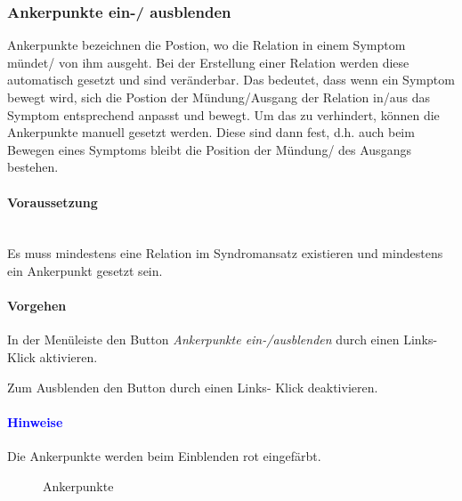 \documentclass[enabledeprecatedfontcommands,fontsize=11pt,paper=a4,twoside]{scrartcl}
\newcounter{one}
\newcounter{two}[one]
\newcommand*{\hint}{\paragraph{\textcolor{blue}{Hinweise}}}
\newcommand*{\condition}{\paragraph{Voraussetzung}$\;$ \vspace{0.2cm}\\}
\newcommand*{\action}{\paragraph{Vorgehen}}
\let\tempone\itemize
\let\temptwo\enditemize
\renewenvironment{itemize}{\tempone\addtolength{\itemsep}{-10.0pt}}{\temptwo}
\let\origenumerate\enumerate
\let\origendenumerate\endenumerate
\renewenvironment{enumerate}{\origenumerate \addtolength{\itemsep}{-10.0pt}}{\origendenumerate}
\begin{document}
\subsubsection{Ankerpunkte ein-/ ausblenden}
		Ankerpunkte bezeichnen die Postion, wo die Relation in einem Symptom mündet/ von ihm ausgeht. Bei der Erstellung einer Relation werden diese automatisch gesetzt und sind veränderbar. Das bedeutet, dass wenn ein Symptom bewegt wird, sich die Postion der Mündung/Ausgang der Relation in/aus das Symptom entsprechend anpasst und bewegt. Um das zu verhindert, können die Ankerpunkte manuell gesetzt werden. Diese sind dann fest, d.h. auch beim Bewegen eines Symptoms bleibt die Position der Mündung/ des Ausgangs bestehen.
		\condition
		Es muss mindestens eine Relation im Syndromansatz existieren und mindestens ein Ankerpunkt gesetzt sein. 
		\action
		\begin{enumerate}
			\item In der Menüleiste den Button \textit{Ankerpunkte ein-/ausblenden} durch einen Links- Klick aktivieren.
			\item Zum Ausblenden den Button durch einen Links- Klick deaktivieren. 
		\end{enumerate}
		\hint
		\begin{itemize}
			\item Die Ankerpunkte werden beim Einblenden rot eingefärbt. 
		\end{itemize}
		\begin{figure}[ht!]
			\centering
			\caption{Ankerpunkte}		
		\end{figure}
		
		\newpage
\end{document}
